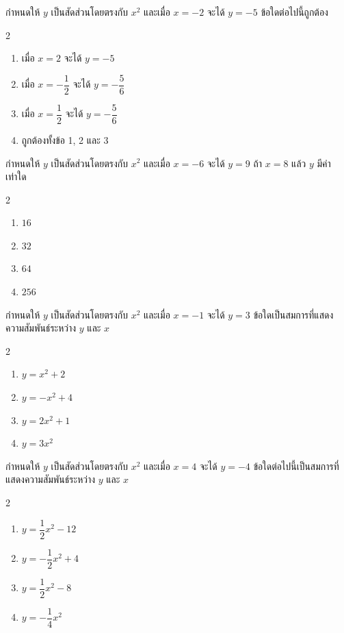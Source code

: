 \newpage
\begin{examplebox}  
กำหนดให้ $y$ เป็นสัดส่วนโดยตรงกับ $x^2$ และเมื่อ $x=-2$ จะได้ $y=-5$  
ข้อใดต่อไปนี้ถูกต้อง
\begin{multicols}{2} \begin{enumerate}
\item เมื่อ $x=2$ จะได้ $y=-5$
\item เมื่อ $x=-\dfrac{1}{2}$ จะได้ $y=-\dfrac{5}{6}$
\item เมื่อ $x=\dfrac{1}{2}$ จะได้ $y=-\dfrac{5}{6}$
\item ถูกต้องทั้งข้อ 1, 2 และ 3
\end{enumerate} 
\end{multicols}
\end{examplebox}
\newpage
\begin{examplebox}  
กำหนดให้ $y$ เป็นสัดส่วนโดยตรงกับ $x^2$ และเมื่อ $x=-6$ จะได้ $y=9$  
ถ้า $x=8$ แล้ว $y$ มีค่าเท่าใด
\begin{multicols}{2} \begin{enumerate}
\item $16$
\item $32$
\item $64$
\item $256$
\end{enumerate} \end{multicols}
\end{examplebox}
\newpage
\begin{examplebox}  
กำหนดให้ $y$ เป็นสัดส่วนโดยตรงกับ $x^2$ และเมื่อ $x=-1$ จะได้ $y=3$  
ข้อใดเป็นสมการที่แสดงความสัมพันธ์ระหว่าง $y$ และ $x$
\begin{multicols}{2} \begin{enumerate}
\item $y=x^2+2$
\item $y=-x^2+4$
\item $y=2x^2+1$
\item $y=3x^2$
\end{enumerate} \end{multicols}
\end{examplebox}
\newpage
\begin{examplebox}
กำหนดให้ $y$ เป็นสัดส่วนโดยตรงกับ $x^2$ และเมื่อ $x=4$ จะได้ $y=-4$  
ข้อใดต่อไปนี้เป็นสมการที่แสดงความสัมพันธ์ระหว่าง $y$ และ $x$
\begin{multicols}{2} \begin{enumerate}
\item $y=\dfrac{1}{2} x^2-12$
\item $y=-\dfrac{1}{2} x^2+4$
\item $y=\dfrac{1}{2} x^2-8$
\item $y=-\dfrac{1}{4} x^2$
\end{enumerate} \end{multicols}
\end{examplebox}
